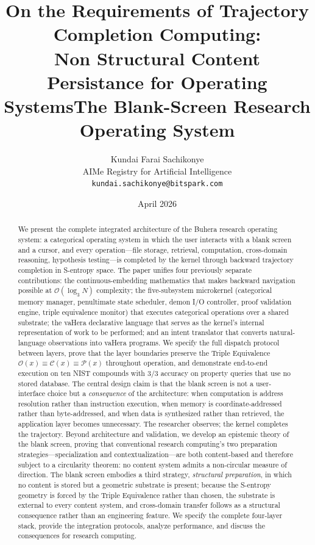 \documentclass[11pt,twocolumn,a4paper]{article}
\title{\textbf{On the Requirements of Trajectory Completion Computing: \\[4pt] Non Structural Content Persistance for Operating SystemsThe Blank-Screen Research Operating System}}
\author{
Kundai Farai Sachikonye\\
AIMe Registry for Artificial Intelligence\\
\texttt{kundai.sachikonye@bitspark.com}
}
\date{April 2026}
\begin{document}
\maketitle

\begin{abstract}
We present the complete integrated architecture of the Buhera research operating system: a categorical operating system in which the user interacts with a blank screen and a cursor, and every operation---file storage, retrieval, computation, cross-domain reasoning, hypothesis testing---is completed by the kernel through backward trajectory completion in S-entropy space. The paper unifies four previously separate contributions: the continuous-embedding mathematics that makes backward navigation possible at $\mathcal{O}(\log_3 N)$ complexity; the five-subsystem microkernel (categorical memory manager, penultimate state scheduler, demon I/O controller, proof validation engine, triple equivalence monitor) that executes categorical operations over a shared substrate; the vaHera declarative language that serves as the kernel's internal representation of work to be performed; and an intent translator that converts natural-language observations into vaHera programs. We specify the full dispatch protocol between layers, prove that the layer boundaries preserve the Triple Equivalence $\mathcal{O}(x) \equiv \mathcal{C}(x) \equiv \mathcal{P}(x)$ throughout operation, and demonstrate end-to-end execution on ten NIST compounds with $3/3$ accuracy on property queries that use no stored database. The central design claim is that the blank screen is not a user-interface choice but a \emph{consequence} of the architecture: when computation is address resolution rather than instruction execution, when memory is coordinate-addressed rather than byte-addressed, and when data is synthesized rather than retrieved, the application layer becomes unnecessary. The researcher observes; the kernel completes the trajectory. Beyond architecture and validation, we develop an epistemic theory of the blank screen, proving that conventional research computing's two preparation strategies---specialization and contextualization---are both content-based and therefore subject to a circularity theorem: no content system admits a non-circular measure of direction. The blank screen embodies a third strategy, \emph{structural preparation}, in which no content is stored but a geometric substrate is present; because the S-entropy geometry is forced by the Triple Equivalence rather than chosen, the substrate is external to every content system, and cross-domain transfer follows as a structural consequence rather than an engineering feature. We specify the complete four-layer stack, provide the integration protocols, analyze performance, and discuss the consequences for research computing.
\end{abstract}
\end{document}
